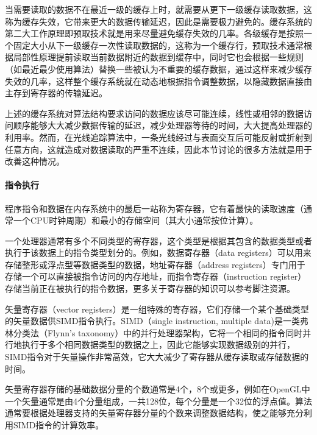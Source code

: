 当需要读取的数据不在最近一级的缓存上时，就需要从更下一级缓存读取数据，这称为缓存失效，它带来更大的数据传输延迟，因此是需要极力避免的。缓存系统的第二大工作原理即预取技术就是用来尽量避免缓存失效的几率。各级缓存是按照一个固定大小从下一级缓存一次性读取数据的，这称为一个缓存行，预取技术通常根据局部性原理提前读取当前数据附近的数据到缓存中，同时它也会根据一些规则（如最近最少使用算法）替换一些被认为不重要的缓存数据，通过这样来减少缓存失效的几率，这样整个缓存系统就在动态地根据指令调整数据，以隐藏数据直接由主存到寄存器的传输延迟。

上述的缓存系统对算法结构要求访问的数据应该尽可能连续，线性或相邻的数据访问顺序能够大大减少数据传输的延迟，减少处理器等待的时间，大大提高处理器的利用率。然而，在光线追踪算法中，一条光线经过与表面交互后可能反射或折射到任意方向，这就造成对数据读取的严重不连续，因此本节讨论的很多方法就是用于改善这种情况。





\paragraph{指令执行}
程序指令和数据在内存系统中的最后一站称为寄存器，它有着最快的读取速度（通常一个CPU时钟周期）和最小的存储空间（其大小通常按位计算）。

一个处理器通常有多个不同类型的寄存器，这个类型是根据其包含的数据类型或者执行于该数据上的指令类型划分的。例如，数据寄存器（data registers）可以用来存储整形或浮点型等数据类型的数据，地址寄存器（address registers）专门用于存储一个可以直接被指令访问的内存地址，而指令寄存器（instruction register）存储当前正在被执行的指令数据，更多关于寄存器的知识可以参考脚注资源。

矢量寄存器（vector registers）是一组特殊的寄存器，它们存储一个某个基础类型的矢量数据供SIMD指令执行。SIMD（single instruction, multiple data)是一类弗林分类法（Flynn's taxonomy）中的并行处理器架构，它将一个相同的指令同时并行地执行于多个相同数据类型的数据之上，因此它能够实现数据级别的并行，SIMD指令对于矢量操作非常高效，它大大减少了寄存器从缓存读取或存储数据的时间。

矢量寄存器存储的基础数据分量的个数通常是4个，8个或更多，例如在OpenGL中一个矢量通常是由4个分量组成，一共128位，每个分量是一个32位的浮点值。算法通常要根据处理器支持的矢量寄存器分量的个数来调整数据结构，使之能够充分利用SIMD指令的计算效率。
 
